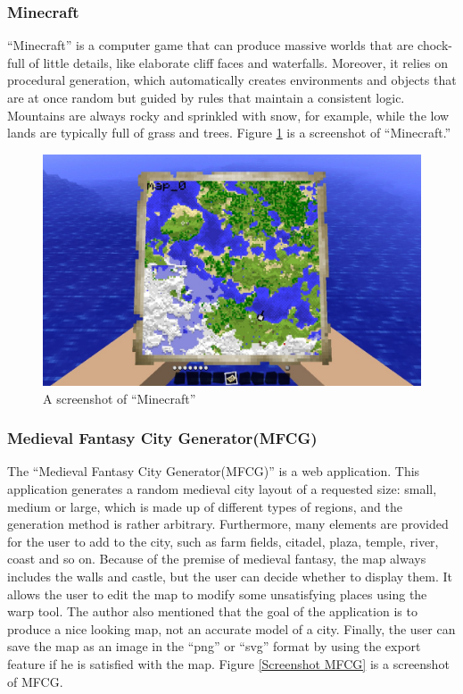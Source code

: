 \subsubsection{Minecraft}
``Minecraft'' is a computer game that can produce massive worlds that are chock-full of little details, like elaborate cliff faces and waterfalls. Moreover, it relies on procedural generation, which automatically creates environments and objects that are at once random but guided by rules that maintain a consistent logic. Mountains are always rocky and sprinkled with snow, for example, while the low lands are typically full of grass and trees. Figure \ref{Screenshot Minecraft} is a screenshot of ``Minecraft.''

\begin{figure}[htb]
\centering
\includegraphics[width=\textwidth]{section01/assets/screenshot_Minecraft.jpg}
\caption[A screenshot of ``Minecraft'']{\label{Screenshot Minecraft}A screenshot of ``Minecraft''}
\end{figure}

\subsubsection{Medieval Fantasy City Generator(MFCG)}
The ``Medieval Fantasy City Generator(MFCG)'' is a web application. This application generates a random medieval city layout of a requested size: small, medium or large, which is made up of different types of regions, and the generation method is rather arbitrary. Furthermore, many elements are provided for the user to add to the city, such as farm fields, citadel, plaza, temple, river, coast and so on. Because of the premise of medieval fantasy, the map always includes the walls and castle, but the user can decide whether to display them. It allows the user to edit the map to modify some unsatisfying places using the warp tool. The author also mentioned that the goal of the application is to produce a nice looking map, not an accurate model of a city. Finally, the user can save the map as an image in the ``png'' or ``svg'' format by using the export feature if he is satisfied with the map. Figure \ref{Screenshot MFCG} is a screenshot of MFCG.

